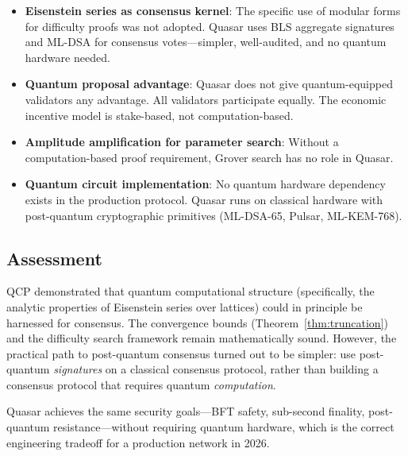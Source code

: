 \begin{itemize}[nosep]
  \item \textbf{Eisenstein series as consensus kernel}: The specific use
        of modular forms for difficulty proofs was not adopted. Quasar
        uses BLS aggregate signatures and ML-DSA for consensus
        votes---simpler, well-audited, and no quantum hardware needed.
  \item \textbf{Quantum proposal advantage}: Quasar does not give
        quantum-equipped validators any advantage. All validators
        participate equally. The economic incentive model is
        stake-based, not computation-based.
  \item \textbf{Amplitude amplification for parameter search}: Without
        a computation-based proof requirement, Grover search has no
        role in Quasar.
  \item \textbf{Quantum circuit implementation}: No quantum hardware
        dependency exists in the production protocol. Quasar runs on
        classical hardware with post-quantum cryptographic primitives
        (ML-DSA-65, Pulsar, ML-KEM-768).
\end{itemize}

\subsection{Assessment}

QCP demonstrated that quantum computational structure (specifically,
the analytic properties of Eisenstein series over lattices) could in
principle be harnessed for consensus. The convergence bounds
(Theorem~\ref{thm:truncation}) and the difficulty search framework
remain mathematically sound. However, the practical path to
post-quantum consensus turned out to be simpler: use post-quantum
\emph{signatures} on a classical consensus protocol, rather than
building a consensus protocol that requires quantum \emph{computation}.

Quasar achieves the same security goals---BFT safety, sub-second
finality, post-quantum resistance---without requiring quantum hardware,
which is the correct engineering tradeoff for a production network in
2026.

